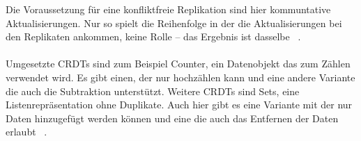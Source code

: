 Die Voraussetzung für eine konfliktfreie Replikation sind hier kommuntative Aktualisierungen.
Nur so spielt die Reihenfolge in der die Aktualisierungen bei den Replikaten ankommen, keine Rolle -- das Ergebnis ist dasselbe ~\cite{crdt_shapiro2}.\\\\
Umgesetzte \glspl{CRDT} sind zum Beispiel Counter, ein Datenobjekt das zum Zählen verwendet wird. Es gibt einen, der nur hochzählen kann und eine andere Variante die auch die Subtraktion unterstützt.
Weitere \glspl{CRDT} sind Sets, eine Listenrepräsentation ohne Duplikate. Auch hier gibt es eine Variante mit der nur Daten hinzugefügt werden können und eine die auch das Entfernen der Daten erlaubt ~\cite{crdt_shapiro}.
%
%
